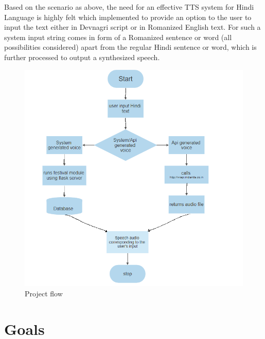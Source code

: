 \documentclass{article}
\begin{document}
\bigskip

Based on the scenario as above, the need for an effective 
TTS system for Hindi Language is highly felt which 
implemented to provide an option to the user to input the
text either in Devnagri script or in Romanized English 
text. For such a system input string comes in form of a 
Romanized sentence or word (all possibilities considered) 
apart from the regular Hindi sentence or word, which is 
further processed to output a synthesized speech.
\bigskip


\newpage

\begin{figure}[htp]
    \centering
    \includegraphics[width=14cm]{flow}
    \caption{Project flow}
    \label{fig:flow.PNG}
\end{figure}

\newpage
\section{Goals}
\end{document}
